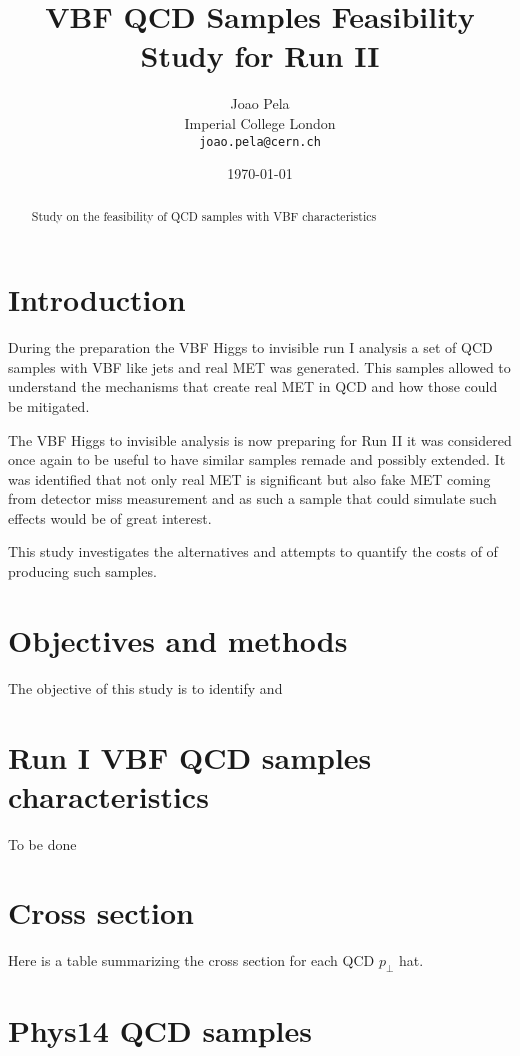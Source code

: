 \documentclass[a4paper]{article}
\title{VBF QCD Samples Feasibility Study for Run II}
\author{Joao Pela\\
 Imperial College London\\
   \texttt{joao.pela@cern.ch}}
\date{\today}
\begin{document}
\maketitle

\begin{abstract}
Study on the feasibility of QCD samples with VBF characteristics
\end{abstract}

\section{Introduction}

During the preparation the VBF Higgs to invisible run I analysis a set of QCD samples with VBF like jets and real MET was generated. This samples allowed to understand the mechanisms that create real MET in QCD and how those could be mitigated. 

The VBF Higgs to invisible analysis is now preparing for Run II it was considered once again to be useful to have similar samples remade and possibly extended. It was identified that not only real MET is significant but also fake MET coming from detector miss measurement and as such a sample that could simulate such effects would be of great interest.

This study investigates the alternatives and attempts to quantify the costs of of producing such samples.

\section{Objectives and methods}

The objective of this study is to identify and 

\section{Run I VBF QCD samples characteristics}

To be done

\section{Cross section}

Here is a table summarizing the cross section for each QCD $p_\perp$ hat.



\section{Phys14 QCD samples}
\end{document}
